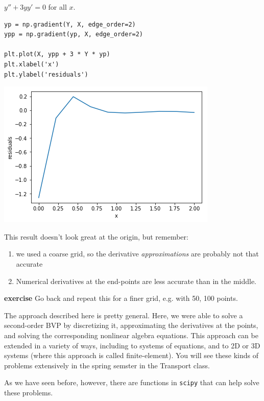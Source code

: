 \documentclass[11pt]{article}
\begin{document}
\(y'' + 3 y y' = 0\) for all \(x\).

\begin{verbatim}
yp = np.gradient(Y, X, edge_order=2)
ypp = np.gradient(yp, X, edge_order=2)

plt.plot(X, ypp + 3 * Y * yp)
plt.xlabel('x')
plt.ylabel('residuals')
\end{verbatim}

\begin{center}
\includegraphics[width=.9\linewidth]{obipy-resources/9f7f3151fe203e2a10edce4b06f0b33f-90490pEn.png}
\end{center}

This result doesn't look great at the origin, but remember:
\begin{enumerate}
\item we used a coarse grid, so the derivative \emph{approximations} are probably not that accurate
\item Numerical derivatives at the end-points are less accurate than in the middle.
\end{enumerate}

\textbf{exercise} Go back and repeat this for a finer grid, e.g. with 50, 100 points.

The approach described here is pretty general. Here, we were able to solve a second-order BVP by discretizing it, approximating the derivatives at the points, and solving the corresponding nonlinear algebra equations. This approach can be extended in a variety of ways, including to systems of equations, and to 2D or 3D systems (where this approach is called finite-element). You will see these kinds of problems extensively in the spring semster in the Transport class.

As we have seen before, however, there are functions in \texttt{scipy} that can help solve these problems.
\end{document}
